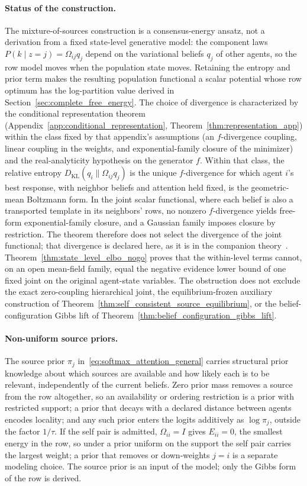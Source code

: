 \documentclass[11pt]{article}
\begin{document}
\paragraph{Status of the construction.} The mixture-of-sources construction is a consensus-energy ansatz, not a derivation from a fixed state-level generative model: the component laws $P(k \mid z{=}j) = \Omega_{ij}q_j$ depend on the variational beliefs $q_j$ of other agents, so the row model moves when the population state moves. Retaining the entropy and prior term makes the resulting population functional a scalar potential whose row optimum has the log-partition value derived in Section~\ref{sec:complete_free_energy}. The choice of divergence is characterized by the conditional representation theorem (Appendix~\ref{app:conditional_representation}, Theorem~\ref{thm:representation_app}) within the class fixed by that appendix's assumptions (an $f$-divergence coupling, linear coupling in the weights, and exponential-family closure of the minimizer) and the real-analyticity hypothesis on the generator $f$. Within that class, the relative entropy $D_{\mathrm{KL}}(q_i\|\Omega_{ij}q_j)$ is the unique $f$-divergence for which agent $i$'s best response, with neighbor beliefs and attention held fixed, is the geometric-mean Boltzmann form. In the joint scalar functional, where each belief is also a transported template in its neighbors' rows, no nonzero $f$-divergence yields free-form exponential-family closure, and a Gaussian family imposes closure by restriction. The theorem therefore does not select the divergence of the joint functional; that divergence is declared here, as it is in the companion theory~\cite[Chs.~6 and~12]{DennisGaugeVFE2026}. Theorem~\ref{thm:state_level_elbo_nogo} proves that the within-level terms cannot, on an open mean-field family, equal the negative evidence lower bound of one fixed joint on the original agent-state variables. The obstruction does not exclude the exact zero-coupling hierarchical joint, the equilibrium-frozen auxiliary construction of Theorem~\ref{thm:self_consistent_source_equilibrium}, or the belief-configuration Gibbs lift of Theorem~\ref{thm:belief_configuration_gibbs_lift}.

\paragraph{Non-uniform source priors.} The source prior $\pi_j$ in~\eqref{eq:softmax_attention_general} carries structural prior knowledge about which sources are available and how likely each is to be relevant, independently of the current beliefs. Zero prior mass removes a source from the row altogether, so an availability or ordering restriction is a prior with restricted support; a prior that decays with a declared distance between agents encodes locality; and any such prior enters the logits additively as $\log\pi_j$, outside the factor $1/\tau$. If the self pair is admitted, $\Omega_{ii} = I$ gives $E_{ii} = 0$, the smallest energy in the row, so under a prior uniform on the support the self pair carries the largest weight; a prior that removes or down-weights $j = i$ is a separate modeling choice. The source prior is an input of the model; only the Gibbs form of the row is derived.
\end{document}
